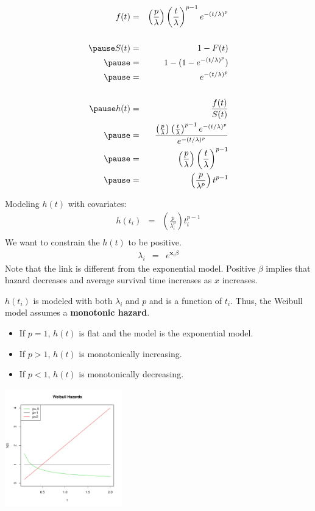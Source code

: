 \documentclass{beamer}
\begin{document}
\begin{frame}
\begin{eqnarray*}
f(t) &=& \left( \frac{p}{\lambda} \right) \left( \frac{t}{\lambda}
\right) ^ {p-1} e^{-(t/\lambda)^p} \\\\
\pause
S(t) &=& 1 - F(t) \\
\pause
&=& 1 - (1 - e^{-(t/\lambda)^p})\\
\pause
&=& e^{-(t/\lambda)^p}\\\\
\pause
h(t) &=& \frac{f(t)}{S(t)}\\
\pause
&=& \dfrac{\left( \frac{p}{\lambda} \right) \left( \frac{t}{\lambda}
\right) ^ {p-1} e^{-(t/\lambda)^p}}{e^{-(t/\lambda)^p}}\\
\pause
&=& \left( \frac{p}{\lambda} \right) \left( \frac{t}{\lambda}
\right) ^ {p-1}\\
\pause
&=& \left( \frac{p}{\lambda ^p} \right) t^{p-1}
\end{eqnarray*}
\end{frame}

\begin{frame}
Modeling $h(t)$ with covariates:
\pause
\begin{eqnarray*}
h(t_i) &=& \left( \frac{p}{\lambda_i ^p} \right) t_i^{p-1}\\
\end{eqnarray*}
\pause
We want to constrain the $h(t)$ to be positive.
\pause
\begin{eqnarray*}
\lambda_i &=& e^{\mathbf{x}_i \beta}
\end{eqnarray*}
\pause
Note that the link is different from the exponential model.  \pause Positive
$\beta$ implies that hazard decreases and average survival time increases as $x$ increases.\\
\end{frame}

\begin{frame}
$h(t_i)$ is modeled with both $\lambda_i$ and $p$ and is a function of
$t_i$. Thus, the
Weibull model assumes a \textbf{monotonic hazard}.
\pause
\begin{itemize}
\item If $p = 1$, $h(t)$ is flat and the model is the exponential
model.
\pause
\item If $p > 1$, $h(t)$ is monotonically increasing.
\pause
\item If $p < 1$, $h(t)$ is monotonically decreasing.
\end{itemize}
\pause
\begin{center}
\includegraphics[width = 2in, height = 2in]{survival_present-weibhaz.pdf}
\end{center}
\end{frame}
\end{document}
